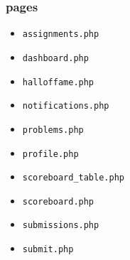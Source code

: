\subsubsection{pages}
\begin{itemize}
	\item \texttt{assignments.php}
	\item \texttt{dashboard.php}
	\item \texttt{halloffame.php}
	\item \texttt{notifications.php}
	\item \texttt{problems.php}
	\item \texttt{profile.php}
	\item \texttt{scoreboard\_table.php}
	\item \texttt{scoreboard.php}
	\item \texttt{submissions.php}
	\item \texttt{submit.php}
\end{itemize}
